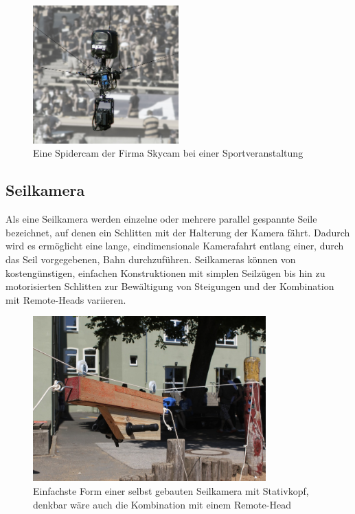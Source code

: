 \documentclass[a4paper, 12pt, bibliography=totocnumbered, listof=numbered]{scrartcl}
\begin{document}
	\begin{figure}[htb]
		\centering
		\includegraphics[width=0.5\textwidth]{Bilder/SkycamHDClipEnhanced0346}
		\caption[Quelle:\newline \url{http://de.wikipedia.org/w/index.php?title=Datei:SkycamHDClipEnhanced0346.jpg&filetimestamp=20070922180859}]{Eine Spidercam der Firma Skycam bei einer Sportveranstaltung}
	\end{figure}

	\subsection{Seilkamera}
	Als eine Seilkamera werden einzelne oder mehrere parallel gespannte Seile bezeichnet, auf denen ein Schlitten mit der Halterung der Kamera fährt. Dadurch wird es ermöglicht eine lange, eindimensionale Kamerafahrt entlang einer, durch das Seil vorgegebenen, Bahn durchzuführen. Seilkameras können von kostengünstigen, einfachen Konstruktionen mit simplen Seilzügen bis hin zu motorisierten Schlitten zur Bewältigung von Steigungen und der Kombination mit Remote-Heads variieren.

	\begin{figure}[htb]
		\centering
		\includegraphics[width=0.8\textwidth]{Bilder/Seilkamera}
		\caption{Einfachste Form einer selbst gebauten Seilkamera mit Stativkopf, denkbar wäre auch die Kombination mit einem Remote-Head}
	\end{figure}
\end{document}
